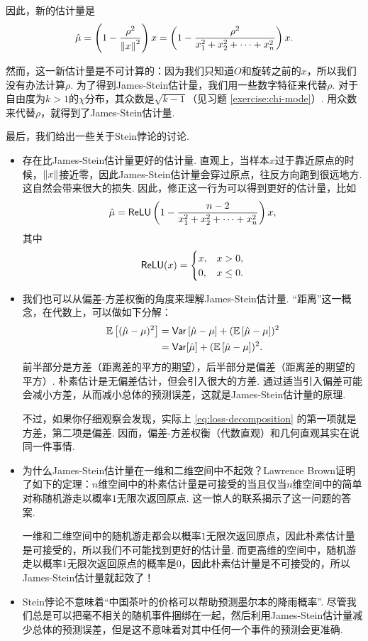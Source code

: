 因此，新的估计量是
\[\hat\mu = \left(1-\frac{\rho^2}{\left\|x\right\|^2}\right)x=\left(1-\frac{\rho^2}{x_1^2+x_2^2+\dots+x_n^2}\right)x.\]

然而，这一新估计量是不可计算的：因为我们只知道$O$和旋转之前的$x$，所以我们没有办法计算$\rho$. 为了得到James-Stein估计量，我们用一些数字特征来代替$\rho$. 对于自由度为$k>1$的$\chi$分布，其众数是$\sqrt{k-1}$（见习题 \ref{exercise:chi-mode}）. 用众数来代替$\rho$，就得到了James-Stein估计量. 

最后，我们给出一些关于Stein悖论的讨论. 

\begin{itemize}
    \item 存在比James-Stein估计量更好的估计量. 直观上，当样本$x$过于靠近原点的时候，$\left\|x\right\|$接近零，因此James-Stein估计量会穿过原点，往反方向跑到很远地方. 这自然会带来很大的损失. 因此，修正这一行为可以得到更好的估计量，比如
    \[\hat\mu=\mathsf{ReLU}\left(1-\frac{n-2}{x_1^2+x_2^2+\dots+x_n^2}\right)x,\]
    其中
    \[\mathsf{ReLU}(x)=\begin{cases}
        x, & x>0,\\
        0, & x\leq 0.
    \end{cases}\]
    \item 我们也可以从偏差-方差权衡的角度来理解James-Stein估计量. “距离”这一概念，在代数上，可以做如下分解：
    \begin{align*}
    \mathbb{E}\left[(\hat{\mu}-\mu)^2\right] &= \mathsf{Var} \left[\hat{\mu}-\mu\right] + (\mathbb{E}\left[\hat{\mu}-\mu\right])^2 \\
    &= \mathsf{Var} [\hat{\mu}] + (\mathbb{E}\left[\hat{\mu}-\mu\right])^2.
    \end{align*}
    前半部分是方差（距离差的平方的期望），后半部分是偏差（距离差的期望的平方）. 朴素估计是无偏差估计，但会引入很大的方差. 通过适当引入偏差可能会减小方差，从而减小总体的预测误差，这就是James-Stein估计量的原理. 
    
    不过，如果你仔细观察会发现，实际上 \eqref{eq:loss-decomposition} 的第一项就是方差，第二项是偏差. 因而，偏差-方差权衡（代数直观）和几何直观其实在说同一件事情. 

    \item 为什么James-Stein估计量在一维和二维空间中不起效？Lawrence Brown证明了如下的定理：$n$维空间中的朴素估计量是可接受的当且仅当$n$维空间中的简单对称随机游走以概率$1$无限次返回原点. 这一惊人的联系揭示了这一问题的答案. 
    
    一维和二维空间中的随机游走都会以概率$1$无限次返回原点，因此朴素估计量是可接受的，所以我们不可能找到更好的估计量. 而更高维的空间中，随机游走以概率$1$无限次返回原点的概率是$0$，因此朴素估计量是不可接受的，所以James-Stein估计量就起效了！

    \item Stein悖论不意味着“中国茶叶的价格可以帮助预测墨尔本的降雨概率”. 尽管我们总是可以把毫不相关的随机事件捆绑在一起，然后利用James-Stein估计量减少总体的预测误差，但是这不意味着对其中任何一个事件的预测会更准确. 
\end{itemize}

